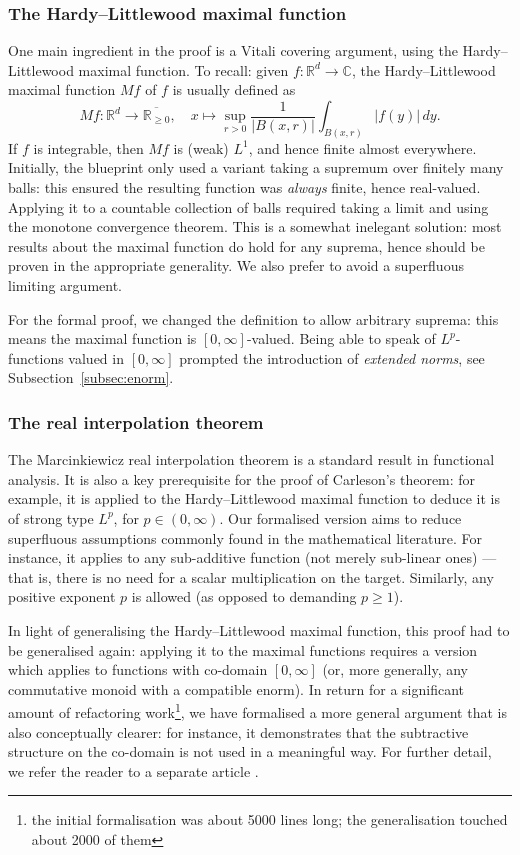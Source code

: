 \documentclass[12pt]{amsart}
\newcommand*{\complex}{\mathbb{C}} %
\newcommand*{\real}{\mathbb{R}} %
\newcommand{\ennreal}{\overline{\real_{\ge0}}}
\begin{document}
\subsubsection{The Hardy--Littlewood maximal function} One main ingredient in the proof is a Vitali covering argument, using the Hardy--Littlewood maximal function.
To recall: given $f\colon\real^d\to\complex$, the Hardy–Littlewood maximal function $M f$ of $f$ is usually defined as
\begin{equation*}
Mf\colon\real^d \to\ennreal, \quad x\mapsto \sup_{r>0}\frac{1}{|B(x,r)|}\int_{B(x,r)}|f(y)|\,dy.
\end{equation*}
If $f$ is integrable, then $M f$ is (weak) $L^1$, and hence finite almost everywhere. Initially, the blueprint only used a variant taking a supremum over finitely many balls: this ensured the resulting function was \emph{always} finite, hence real-valued. Applying it to a countable collection of balls required taking a limit and using the monotone convergence theorem.
This is a somewhat inelegant solution: most results about the maximal function do hold for any suprema, hence should be proven in the appropriate generality. We also prefer to avoid a superfluous limiting argument.

For the formal proof, we changed the definition to allow arbitrary suprema: this means the maximal function is $[0,\infty]$-valued. Being able to speak of $L^p$-functions valued in $[0,\infty]$ prompted the introduction of \emph{extended norms}, see Subsection~\ref{subsec:enorm}.

\subsubsection{The real interpolation theorem}\label{subsubsec:real_interpolation}
The Marcinkiewicz real interpolation theorem is a standard result in functional analysis.
It is also a key prerequisite for the proof of Carleson's theorem: for example, it is applied to the Hardy–Littlewood maximal function to deduce it is of strong type $L^p$, for $p\in(0,\infty)$.
Our formalised version aims to reduce superfluous assumptions commonly found in the mathematical literature. For instance, it applies to any sub-additive function (not merely sub-linear ones) --- that is, there is no need for a scalar multiplication on the target. Similarly, any positive exponent $p$ is allowed (as opposed to demanding $p\geq 1$).

In light of generalising the Hardy--Littlewood maximal function, this proof had to be generalised again:
applying it to the maximal functions requires a version which applies to functions with co-domain $[0, \infty]$ (or, more generally, any commutative monoid with a compatible enorm).
In return for a significant amount of refactoring work\footnote{the initial formalisation was about 5000 lines long; the generalisation touched about 2000 of them},
we have formalised a more general argument that is also conceptually clearer: for instance, it demonstrates that the subtractive structure on the co-domain is not used in a meaningful way.
For further detail, we refer the reader to a separate article \cite{PortegiesRothgangRealInterpolation}.
\end{document}
